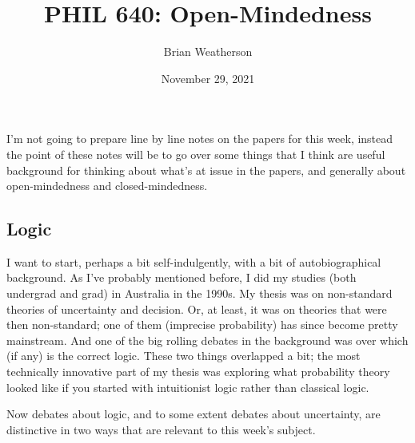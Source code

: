 \documentclass[
]{article}
\title{PHIL 640: Open-Mindedness}
\author{Brian Weatherson}
\date{November 29, 2021}
\begin{document}
\maketitle

I'm not going to prepare line by line notes on the papers for this week,
instead the point of these notes will be to go over some things that I
think are useful background for thinking about what's at issue in the
papers, and generally about open-mindedness and closed-mindedness.

\hypertarget{logic}{%
\subsection{Logic}\label{logic}}

I want to start, perhaps a bit self-indulgently, with a bit of
autobiographical background. As I've probably mentioned before, I did my
studies (both undergrad and grad) in Australia in the 1990s. My thesis
was on non-standard theories of uncertainty and decision. Or, at least,
it was on theories that were then non-standard; one of them (imprecise
probability) has since become pretty mainstream. And one of the big
rolling debates in the background was over which (if any) is the correct
logic. These two things overlapped a bit; the most technically
innovative part of my thesis was exploring what probability theory
looked like if you started with intuitionist logic rather than classical
logic.

Now debates about logic, and to some extent debates about uncertainty,
are distinctive in two ways that are relevant to this week's subject.
\end{document}
